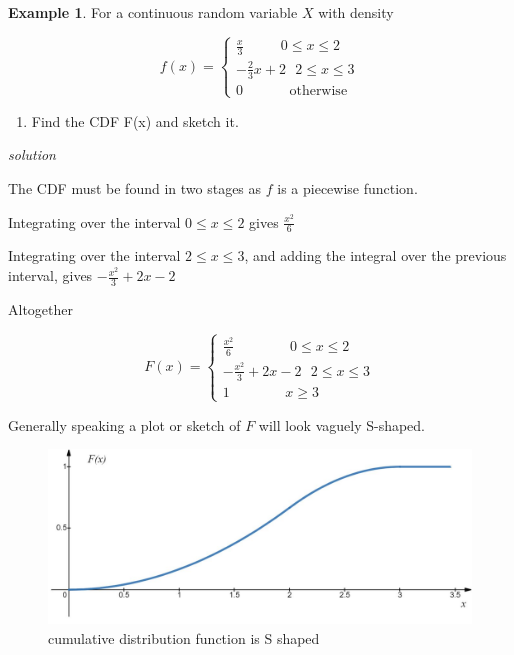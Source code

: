 \documentclass[
]{book}
\providecommand{\tightlist}{%
  \setlength{\itemsep}{0pt}\setlength{\parskip}{0pt}}
\theoremstyle{definition}
\theoremstyle{definition}
\newtheorem{example}{Example}[chapter]
\theoremstyle{definition}
\theoremstyle{definition}
\theoremstyle{remark}
\begin{document}
\begin{example}
For a continuous random variable \(X\) with density

\begin{equation*}
  f(x)=\begin{cases}
        \frac{x}{3} \ \ \ \ \ \ \ \ \ \ \ \ 0\leq x\leq 2  \\
        -\frac{2}{3}x+2 \ \ \   2\leq x \leq 3\\
        0 \ \ \ \ \ \ \ \ \ \ \ \  \ \ \ \text{otherwise}
  \end{cases}
\end{equation*}

\begin{enumerate}
\def\labelenumi{\alph{enumi})}
\tightlist
\item
  Find the CDF F(x) and sketch it.
\end{enumerate}

\emph{solution}

The CDF must be found in two stages as \(f\) is a piecewise function.

Integrating over the interval \(0\leq x\leq 2\) gives \(\frac{x^2}{6}\)

Integrating over the interval \(2\leq x \leq 3\), and adding the integral over the previous interval, gives \(-\frac{x^2}{3} +2x -2\)

Altogether

\begin{equation*}
  F(x)=\begin{cases}
        \frac{x^2}{6} \ \ \ \ \ \ \ \ \ \ \ \ \ \ \ \ \ \ 0\leq x\leq 2  \\
        -\frac{x^2}{3} +2x -2 \ \ \   2\leq x \leq 3\\
        1 \ \ \ \ \ \ \ \ \ \  \ \ \ \ \  \ \ \ x\geq 3
  \end{cases}
\end{equation*}
\end{example}

Generally speaking a plot or sketch of \(F\) will look vaguely S-shaped.

\begin{figure}

{\centering \includegraphics[width=0.75\linewidth]{./figures/cum1} 

}

\caption{cumulative distribution function is S shaped}\label{fig:cum1}
\end{figure}
\end{document}

